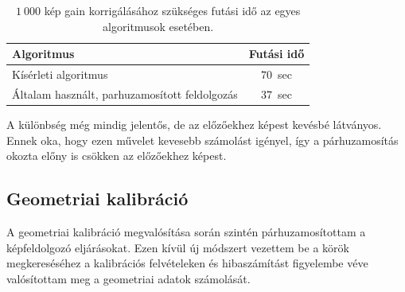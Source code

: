 \documentclass[a4paper,12pt]{article}
\begin{document}
 \begin{table}[htbp]
\centering
\begin{tabular}{|l|c|}\hline
Algoritmus                                                 & Futási idő               \\ \hline
Kísérleti algoritmus                                       & {$70$~sec}  \\ \hline
Általam használt, parhuzamosított feldolgozás              & {$37$~sec} \\ \hline
\end{tabular}
\caption{\label{gainkorrfutas}
$1~000$ kép gain korrigálásához szükséges futási idő az egyes algoritmusok esetében.}
\end{table}


A különbség még mindig jelentős, de az előzőekhez képest kevésbé látványos. Ennek oka, hogy ezen művelet kevesebb számolást igényel, így a párhuzamosítás okozta előny is csökken az előzőekhez képest.

\subsection{Geometriai kalibráció}

A geometriai kalibráció megvalósítása során szintén párhuzamosítottam a képfeldolgozó eljárásokat. Ezen kívül új módszert vezettem be a körök megkereséséhez a kalibrációs felvételeken és hibaszámítást figyelembe véve valósítottam meg a geometriai adatok számolását.
\end{document}
